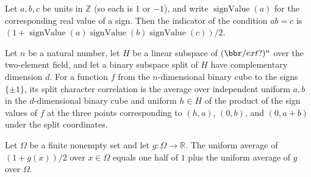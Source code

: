 \begin{theorem}
\label{FABL.splitCharacter_indicator_eq}
\leanok
{}
Let $a,b,c$ be units in $\mathbb{Z}$ (so each is $1$ or $-1$), and write $\operatorname{signValue}(a)$ for the
corresponding real value of a sign. Then the indicator of the condition $ab=c$ is
$(1+\operatorname{signValue}(a)\operatorname{signValue}(b)\operatorname{signValue}(c))/2$.
\end{theorem}

\begin{definition}
\label{FABL.splitCharacterCorrelation}
\leanok
{}
Let $n$ be a natural number, let $H$ be a linear subspace of $(\bbr/	ext{?})^n$ over the
two-element field, and let a binary subspace split of $H$ have complementary dimension
$d$. For a function $f$ from the $n$-dimensional binary cube to the signs $\{\pm1\}$,
its split character correlation is the average over independent uniform $a,b$ in the
$d$-dimensional binary cube and uniform $h\in H$ of the product of the sign values of
$f$ at the three points corresponding to $(h,a)$, $(0,b)$, and $(0,a+b)$ under the split
coordinates.
\end{definition}

\begin{theorem}
\label{FABL.expect_one_add_div_two}
\leanok
{}
Let $\Omega$ be a finite nonempty set and let $g:\Omega\to\mathbb R$. The uniform
average of $(1+g(x))/2$ over $x\in\Omega$ equals one half of $1$ plus the uniform
average of $g$ over $\Omega$.
\end{theorem}


